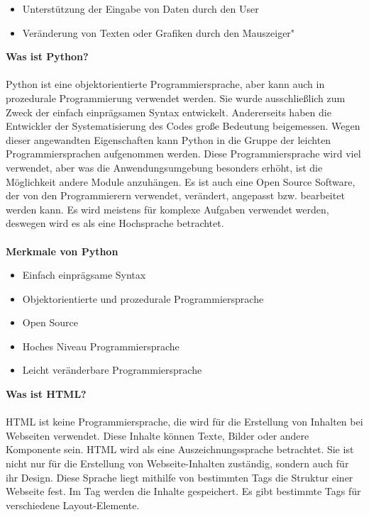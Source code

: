 \begin{itemize}
	\item 	Unterstützung der Eingabe von Daten durch den User
\end{itemize}
\begin{itemize}
	\item Veränderung von Texten oder Grafiken durch den Mauszeiger"
\end{itemize}
\textbf{Was ist Python?} \\
\\
Python ist eine objektorientierte Programmiersprache, aber kann auch in prozedurale Programmierung verwendet werden. Sie wurde ausschließlich zum Zweck der einfach einprägsamen Syntax entwickelt. Andererseits haben die Entwickler der Systematisierung des Codes große Bedeutung beigemessen. Wegen dieser angewandten Eigenschaften kann Python in die Gruppe der leichten Programmiersprachen aufgenommen werden. Diese Programmiersprache wird viel verwendet, aber was die Anwendungsumgebung besonders erhöht, ist die Möglichkeit andere Module anzuhängen. Es ist auch eine Open Source Software, der von den Programmierern verwendet, verändert, angepasst bzw. bearbeitet werden kann. Es wird meistens für komplexe Aufgaben verwendet werden, deswegen wird es als eine Hochsprache betrachtet.
\\
\\
\textbf{Merkmale von Python} 
\begin{itemize}
	\item Einfach einprägsame Syntax
\end{itemize}
\begin{itemize}
	\item Objektorientierte und prozedurale Programmiersprache
\end{itemize}
\begin{itemize}
	\item Open Source 
\end{itemize}
\begin{itemize}
	\item Hoches Niveau Programmiersprache
\end{itemize}
\begin{itemize}
	\item Leicht veränderbare Programmiersprache
\end{itemize}
\textbf{Was ist HTML?} \\
\\
HTML ist keine Programmiersprache, die wird für die Erstellung von Inhalten bei Webseiten verwendet. Diese Inhalte können Texte, Bilder oder andere Komponente sein. HTML wird als eine Auszeichnungssprache betrachtet. Sie ist nicht nur für die Erstellung von Webseite-Inhalten zuständig, sondern auch für ihr Design. Diese Sprache liegt mithilfe von bestimmten Tags die Struktur einer Webseite fest. Im Tag werden die Inhalte gespeichert. Es gibt bestimmte Tags für verschiedene Layout-Elemente. %
